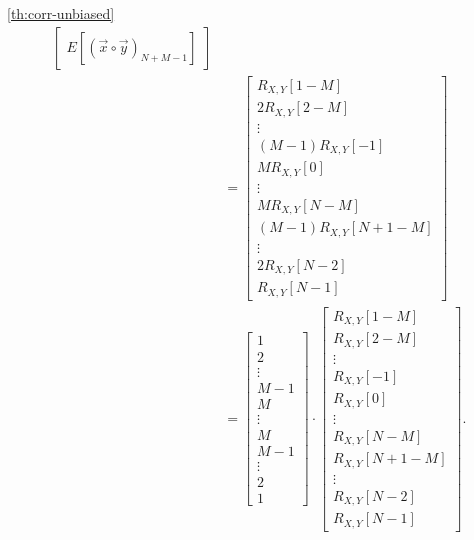 \documentclass[a4paper, openany, oneside]{memoir}
\begin{document}
\begin{blockProofTheorem}{\ref{th:corr-unbiased}}
\begin{align*}
\begin{bmatrix}
            E[(\vec{x} \circ \vec{y})_{N+M-1}]
        \end{bmatrix} \\
        &= \begin{bmatrix}
            R_{X,Y}[1-M] \\
            2 R_{X,Y}[2-M] \\
            \vdots \\
            (M-1) R_{X,Y}[-1] \\
            M R_{X,Y}[0] \\
            \vdots \\
            M R_{X,Y}[N-M] \\
            (M-1) R_{X,Y}[N+1-M] \\
            \vdots \\
            2 R_{X,Y}[N-2] \\
            R_{X,Y}[N-1]
        \end{bmatrix} \\
        &= \begin{bmatrix}
            1 \\
            2 \\
            \vdots \\
            M-1 \\
            M \\
            \vdots \\
            M \\
            M-1 \\
            \vdots \\
            2 \\
            1
        \end{bmatrix} \cdot \begin{bmatrix}
            R_{X,Y}[1-M] \\
            R_{X,Y}[2-M] \\
            \vdots \\
            R_{X,Y}[-1] \\
            R_{X,Y}[0] \\
            \vdots \\
            R_{X,Y}[N-M] \\
            R_{X,Y}[N+1-M] \\
            \vdots \\
            R_{X,Y}[N-2] \\
            R_{X,Y}[N-1]
        \end{bmatrix}.
    \end{align*}
\end{blockProofTheorem}
\end{document}
